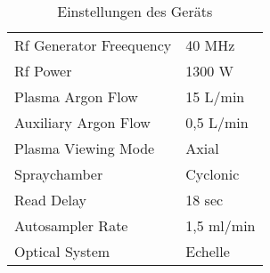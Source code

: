 \begin{table}[htbp]
  \centering
  \caption{Einstellungen des Geräts}
    \begin{tabular}{ll}
    \toprule
    Rf Generator Freequency & 40 MHz \\
    Rf Power & 1300 W \\
    Plasma Argon Flow & 15 L/min \\
    Auxiliary Argon Flow & 0,5 L/min \\
    Plasma Viewing Mode & Axial \\
    Spraychamber & Cyclonic \\
    Read Delay & 18 sec \\
    Autosampler Rate & 1,5 ml/min \\
    Optical System & Echelle \\
    \bottomrule
    \end{tabular}%
  \label{tab:conditions}%
\end{table}%

